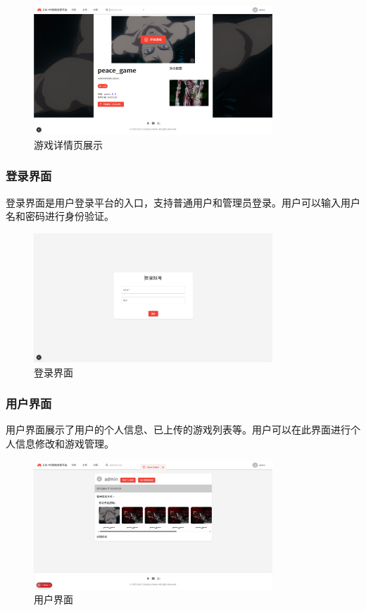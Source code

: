 \documentclass[12pt]{ctexart} %
\begin{document}
 \begin{figure}[H]
  \centering 
  \includegraphics[width=0.8\textwidth]{homepage.png}
  \caption{游戏详情页展示}
\end{figure}

\subsubsection{登录界面}
登录界面是用户登录平台的入口，支持普通用户和管理员登录。用户可以输入用户名和密码进行身份验证。
\begin{figure}[H]
  \centering 
  \includegraphics[width=0.8\textwidth]{login.png}
  \caption{登录界面}
\end{figure}
\subsubsection{用户界面}
用户界面展示了用户的个人信息、已上传的游戏列表等。用户可以在此界面进行个人信息修改和游戏管理。
\begin{figure}[H]
  \centering 
  \includegraphics[width=0.8\textwidth]{userpage.png}
  \caption{用户界面}
\end{figure}
\end{document}
